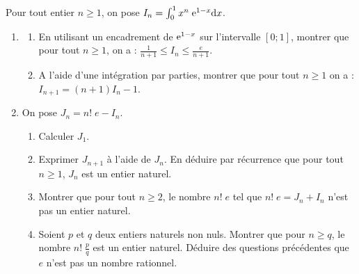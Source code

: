 \begin{description}
                  Pour tout entier $n \geq 1$, on pose $I_n = \int_{0}^{1} x^{n} \; \mathrm{e}^{1-x} \mathrm{d}x$.
                  \begin{enumerate}
                        \item \begin{enumerate}
                                    \item En utilisant un encadrement de $\mathrm{e}^{1-x}$ sur l'intervalle $[0;1]$,
                                          montrer que pour tout $n \geq 1$, on a : 
                                          $\displaystyle{ \frac{1}{n+1} \leq I_n \leq \frac{e}{n+1} }$.
                                    \item A l'aide d'une int\'egration par parties, montrer que pour tout $n \geq 1$ on a : 
                                          $I_{n+1} = (n+1) I_n - 1$.
                              \end{enumerate}
                        \item On pose $J_n = n! \; e - I_n$.
                              \begin{enumerate}
                                    \item Calculer $J_1$.
                                    \item Exprimer $J_{n+1}$ \`a l'aide de $J_n$.
                                          En d\'eduire par r\'ecurrence que pour tout $n \geq 1$, $J_n$ est un entier naturel.
                                    \item Montrer que pour tout $n \geq 2$, le nombre $n! \; e$ tel que $n!\; e = J_n + I_n$
                                          n'est pas un entier naturel.
                                    \item Soient $p$ et $q$ deux entiers naturels non nuls.
                                          Montrer que pour $n \geq q$, le nombre $n! \; \frac{p}{q}$ est un entier naturel.
                                          D\'eduire des questions pr\'ec\'edentes que $e$ n'est pas un nombre rationnel.
                              \end{enumerate}
                  \end{enumerate}
      \end{description}


































